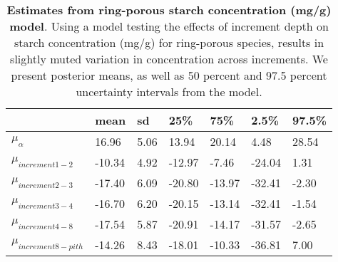 \documentclass{article}\usepackage[]{graphicx}\usepackage[]{color}
\begin{document}
\begin{table}[ht]
\centering
\caption{\textbf{Estimates from ring-porous starch concentration (mg/g) model}. Using a model testing the effects of increment depth on starch concentration (mg/g) for ring-porous species, results in slightly muted variation in concentration across increments. We present posterior means, as well as 50 percent and 97.5 percent uncertainty intervals from the model.} 
\label{tab:ringstar}
\begingroup\footnotesize
\begin{tabular}{|p{}|p{}|p{}|p{}|p{}|p{}|p{}|}
  \hline
 & mean & sd & 25\% & 75\% & 2.5\% & 97.5\% \\ 
  \hline
$\mu_{\alpha}$ & 16.96 & 5.06 & 13.94 & 20.14 & 4.48 & 28.54 \\ 
  $\mu_{increment 1-2}$ & -10.34 & 4.92 & -12.97 & -7.46 & -24.04 & 1.31 \\ 
  $\mu_{increment 2-3}$ & -17.40 & 6.09 & -20.80 & -13.97 & -32.41 & -2.30 \\ 
  $\mu_{increment 3-4}$ & -16.70 & 6.20 & -20.15 & -13.14 & -32.41 & -1.54 \\ 
  $\mu_{increment 4-8}$ & -17.54 & 5.87 & -20.91 & -14.17 & -31.57 & -2.65 \\ 
  $\mu_{increment 8-pith}$ & -14.26 & 8.43 & -18.01 & -10.33 & -36.81 & 7.00 \\ 
   \hline
\end{tabular}
\endgroup
\end{table}
\end{document}
